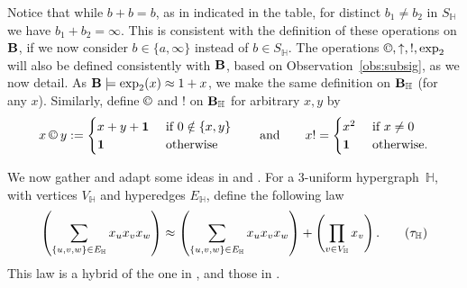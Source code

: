 \documentclass[eqnor,reqno]{amsart}
\theoremstyle{plain}
\theoremstyle{definition}
\newcommand{\cc}{\mathbin{\textup{\copyright}}}
\begin{document}
Notice that while $b+b=b$, as in indicated in the table, for distinct $b_1\neq b_2$ in $S_\mathbb{H}$ we have $b_1+b_2=\infty$.
This is consistent with the definition of these operations on ${\bf B}$, if we now consider  $b\in\{a,\infty\}$ instead of $b\in S_\mathbb{H}$.  
The operations $\cc,\uparrow,!,\exp_2$ will also be defined consistently with ${\bf B}$, based on Observation~\ref{obs:subsig}, as we now detail.  
As ${\bf B}\models \exp_2(x)\approx 1+x$, we make the same definition on ${\bf B}_\mathbb{H}$ (for any $x$).  Similarly, define $\cc$ and $!$ on ${\bf B}_\mathbb{H}$ for arbitrary $x,y$ by
\[
x\cc y:=\begin{cases}
x+y+{\bf 1} &\text{ if $0\notin\{x,y\}$}\\
{\bf 1} &\text{ otherwise}
\end{cases}\qquad \text{and}\qquad
x! = \begin{cases}
x^2&\text{ if $x\neq 0$}\\
{\bf 1} &\text{ otherwise.}
\end{cases}
\]

We now gather and adapt some ideas in \cite{JRZ} and \cite{WRZ}.  
For a $3$-uniform hypergraph~$\mathbb{H}$, with vertices $V_\mathbb{H}$ and hyperedges $E_\mathbb{H}$, define the following law
\[
\left(\sum_{\{u,v,w\}\in E_\mathbb{H}} x_ux_vx_w\right)\approx  \left(\sum_{\{u,v,w\}\in E_\mathbb{H}} x_ux_vx_w\right)+\left(\prod_{v\in V_\mathbb{H}} x_v\right).\tag{$\tau_\mathbb{H}$}\label{eqn:H}
\]
This law is a hybrid of the one in \cite{WRZ}, and those in \cite{JRZ}.    
\end{document}
